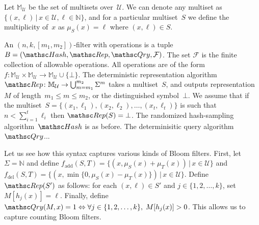 

Let $\mathbb{M}_\mathcal{U}$ be the set of multisets over~$\mathcal{U}$.  We can denote any multiset as $\{(x,\ell) \,|\, x \in \mathcal{U}, \ell \in \mathbb{N}\}$, and for a particular multiset~$S$ we define the multiplicity of~$x$ as $\mu_S(x) = \ell$ where $(x,\ell)\in S$.

An $(n,k,[m_1,m_2])$-filter with operations is a tuple  $B=(\Hash,\Rep,\Qry, \mathcal{F})$.  
The set $\mathcal{F}$ is the finite collection of allowable operations.  All operations are of the form 
$f: \mathbb{M}_{\mathcal{U}} \times \mathbb{M}_{\mathcal{U}} \rightarrow \mathbb{M}_{\mathcal{U}} \cup \{\bot\}$.  
%
The deterministic representation algorithm $\Rep\colon \mathbb{M}_\mathcal{U} \rightarrow \bigcup_{m=m_1}^{m_2}\Sigma^m$ takes a multiset~$S$, and outputs representation~$M$ of length~$m_1 \leq m \leq m_2$, or the distinguished symbol~$\bot$.  We assume that if the multiset~$S=\{(x_1,\ell_1),(x_2,\ell_2),\ldots,(x_t,\ell_t)\}$ is such that $n < \sum_{i=1}^t \ell_i$ then $\Rep(S)=\bot$.
%
The randomized hash-sampling algorithm~$\Hash$ is as before.
%
The determinisitic query algorithm $\Qry$... 


Let us see how this syntax captures various kinds of Bloom filters.  First, let $\Sigma = \mathbb{N}$ and define $f_{\mathrm{add}}(S,T)=\{(x,\mu_S(x)+\mu_T(x)) \,|\, x \in \mathcal{U}\}$ and $f_\mathrm{del}(S,T) = \{(x,\min\{0,\mu_S(x)-\mu_T(x)\}) \,|\, x \in \mathcal{U} \}$.  Define $\Rep(S')$ as follows: for each $(x,\ell)\in S'$ and $j\in\{1,2,\ldots,k\}$, set $M[h_j(x)]=\ell$.   Finally, define $\Qry(M,x) = 1 \Leftrightarrow \forall j \in \{1,2,\ldots,k\},\; M[h_j(x)] > 0$.  This allows us to capture counting Bloom filters. 

\fi